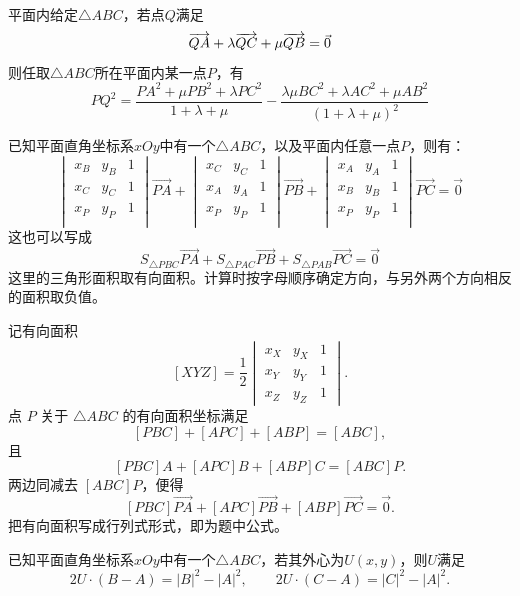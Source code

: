 \begin{conclusion}[平方关系]
    \noindent 平面内给定$\triangle{ABC}$，若点$Q$满足\vspace{-10pt}
    \[\overrightarrow{QA}+\lambda\overrightarrow{QC}+\mu\overrightarrow{QB}=\vec{0}\vspace{-10pt}\]则任取$\triangle{ABC}$所在平面内某一点$P$，有\[PQ^2=\dfrac{PA^2+\mu PB^2+\lambda PC^2}{1+\lambda+\mu}-\dfrac{\lambda\mu BC^2+\lambda AC^2+\mu AB^2}{\left(1+\lambda+\mu\right)^2}\]
\end{conclusion}
\begin{example}[奔驰定理]
    \noindent 已知平面直角坐标系$xOy$中有一个$\triangle{ABC}$，以及平面内任意一点$P$，则有：\[
    \begin{vmatrix}
    x_B & y_B & 1\\
    x_C & y_C & 1\\
    x_P & y_P & 1\\
\end{vmatrix}\overrightarrow{PA}+\begin{vmatrix}
    x_C & y_C & 1\\
    x_A & y_A & 1\\
    x_P & y_P & 1\\
\end{vmatrix}\overrightarrow{PB}+\begin{vmatrix}
    x_A & y_A & 1\\
    x_B & y_B & 1\\
    x_P & y_P & 1\\
\end{vmatrix}\overrightarrow{PC}=\vec{0}\]
这也可以写成\[S_{\triangle{PBC}}\overrightarrow{PA}+S_{\triangle{PAC}}\overrightarrow{PB}+S_{\triangle{PAB}}\overrightarrow{PC}=\vec{0}\]
这里的三角形面积取有向面积。计算时按字母顺序确定方向，与另外两个方向相反的面积取负值。
\end{example}
\begin{solution}
记有向面积
\[
[XYZ]=\frac12\begin{vmatrix}
x_X & y_X & 1\\
x_Y & y_Y & 1\\
x_Z & y_Z & 1
\end{vmatrix}.
\]
点 $P$ 关于 $\triangle ABC$ 的有向面积坐标满足
\[
[PBC]+[APC]+[ABP]=[ABC],
\]
且
\[
[PBC]A+[APC]B+[ABP]C=[ABC]P.
\]
两边同减去 $[ABC]P$，便得
\[
[PBC]\overrightarrow{PA}+[APC]\overrightarrow{PB}+[ABP]\overrightarrow{PC}=\vec0.
\]
把有向面积写成行列式形式，即为题中公式。
\end{solution}
\begin{example}[外心向量关系]
    已知平面直角坐标系$xOy$中有一个$\triangle{ABC}$，若其外心为$U(x,y)$，则$U$满足
    \[
    2U\cdot(B-A)=|B|^2-|A|^2,\qquad
    2U\cdot(C-A)=|C|^2-|A|^2.
    \]
\end{example}
